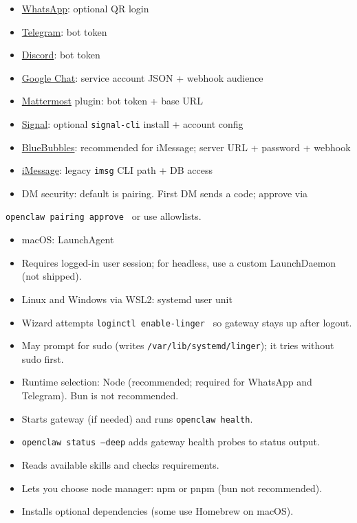 \begin{itemize}
  \item \href{/channels/whatsapp}{WhatsApp}: optional QR login
  \item \href{/channels/telegram}{Telegram}: bot token
  \item \href{/channels/discord}{Discord}: bot token
  \item \href{/channels/googlechat}{Google Chat}: service account JSON + webhook audience
  \item \href{/channels/mattermost}{Mattermost} plugin: bot token + base URL
  \item \href{/channels/signal}{Signal}: optional \texttt{signal-cli} install + account config
  \item \href{/channels/bluebubbles}{BlueBubbles}: recommended for iMessage; server URL + password + webhook
  \item \href{/channels/imessage}{iMessage}: legacy \texttt{imsg} CLI path + DB access
  \item DM security: default is pairing. First DM sends a code; approve via
\end{itemize}

\texttt{openclaw pairing approve  } or use allowlists.
\begin{itemize}
  \item macOS: LaunchAgent
  \item Requires logged-in user session; for headless, use a custom LaunchDaemon (not shipped).
  \item Linux and Windows via WSL2: systemd user unit
  \item Wizard attempts \texttt{loginctl enable-linger } so gateway stays up after logout.
  \item May prompt for sudo (writes \texttt{/var/lib/systemd/linger}); it tries without sudo first.
  \item Runtime selection: Node (recommended; required for WhatsApp and Telegram). Bun is not recommended.
\end{itemize}

\begin{itemize}
  \item Starts gateway (if needed) and runs \texttt{openclaw health}.
  \item \texttt{openclaw status --deep} adds gateway health probes to status output.
\end{itemize}

\begin{itemize}
  \item Reads available skills and checks requirements.
  \item Lets you choose node manager: npm or pnpm (bun not recommended).
  \item Installs optional dependencies (some use Homebrew on macOS).
\end{itemize}

